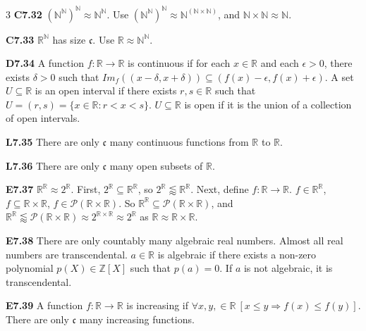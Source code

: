 \documentclass[10pt, landscape]{article}
\begin{document}
\begin{multicols*}{3}
\textbf{C7.32} $(\mathbb{N}^\mathbb{N})^\mathbb{N}\approx \mathbb{N}^\mathbb{N}$. Use $(\mathbb{N}^\mathbb{N})^\mathbb{N}\approx \mathbb{N}^{(\mathbb{N} \times \mathbb{N})}$, and $\mathbb{N} \times \mathbb{N} \approx \mathbb{N}$.

\textbf{C7.33} $\mathbb{R}^\mathbb{N}$ has size $\mathfrak{c}$. Use $\mathbb{R}\approx\mathbb{N}^\mathbb{N}$.

\textbf{D7.34} A function $f:\mathbb{R} \rightarrow \mathbb{R}$ is continuous if for each $x \in \mathbb{R}$ and each $\epsilon > 0$, there exists $\delta > 0$ such that $Im_f((x-\delta, x+\delta)) \subseteq (f(x)-\epsilon, f(x)+\epsilon)$. A set $U \subseteq \mathbb{R}$ is an open interval if there exists $r, s \in \mathbb{R}$ such that $U=(r,s)=\{x \in \mathbb{R} : r < x <s\}$. $U \subseteq \mathbb{R}$ is open if it is the union of a collection of open intervals.

\textbf{L7.35} There are only $\mathfrak{c}$ many continuous functions from $\mathbb{R}$ to $\mathbb{R}$.

\textbf{L7.36} There are only $\mathfrak{c}$ many open subsets of $\mathbb{R}$.

\textbf{E7.37} $\mathbb{R}^\mathbb{R}\approx 2^\mathbb{R}$. First, $2^\mathbb{R} \subseteq \mathbb{R}^\mathbb{R}$, so $2^\mathbb{R} \lessapprox \mathbb{R}^\mathbb{R}$. Next, define $f : \mathbb{R} \rightarrow \mathbb{R}$. $f \in \mathbb{R}^\mathbb{R}$, $f \subseteq \mathbb{R} \times \mathbb{R}$, $f \in \mathcal{P}(\mathbb{R} \times \mathbb{R})$. So $\mathbb{R}^\mathbb{R} \subseteq \mathcal{P}(\mathbb{R} \times \mathbb{R})$, and $\mathbb{R}^\mathbb{R} \lessapprox \mathcal{P}(\mathbb{R} \times \mathbb{R}) \approx 2^{\mathbb{R} \times \mathbb{R}} \approx 2^\mathbb{R}$ as $\mathbb{R} \approx \mathbb{R} \times \mathbb{R}$.

\textbf{E7.38} There are only countably many algebraic real numbers. Almost all real numbers are transcendental. $a \in \mathbb{R}$ is algebraic if there exists a non-zero polynomial $p(X) \in \mathbb{Z}[X]$ such that $p(a)=0$. If $a$ is not algebraic, it is transcendental.

\textbf{E7.39} A function $f : \mathbb{R} \rightarrow \mathbb{R}$ is increasing if $\forall x, y, \in \mathbb{R} \ [x \leq y \Rightarrow f(x) \leq f(y)]$. There are only $\mathfrak{c}$ many increasing functions.


\end{multicols*}
\end{document}
